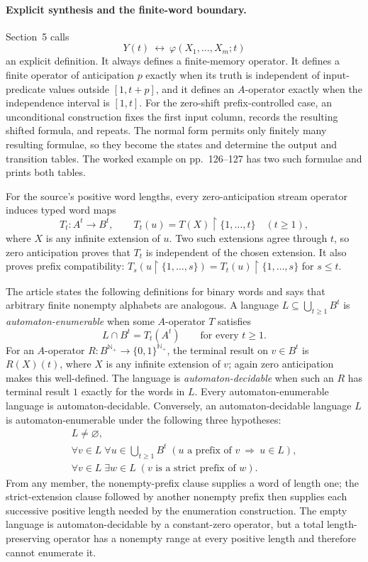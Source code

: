 \paragraph{Explicit synthesis and the finite-word boundary.}
Section~5 calls
\[
  Y(t)\ \longleftrightarrow\ \varphi(X_1,\ldots,X_m;t)
\]
an explicit definition.  It always defines a finite-memory operator.  It
defines a finite operator of anticipation \(p\) exactly when its truth is
independent of input-predicate values outside \([1,t+p]\), and it defines an
\(A\)-operator exactly when the independence interval is \([1,t]\).  For the
zero-shift prefix-controlled case, an unconditional construction fixes the
first input column, records the resulting shifted formula, and repeats.  The
normal form permits only finitely many resulting formulae, so they become the
states and determine the output and transition tables.  The worked example on
pp.~126--127 has two such formulae and prints both tables.

For the source's positive word lengths, every zero-anticipation stream operator
induces typed word maps
\[
  T_t:A^t\longrightarrow B^t,
  \qquad
  T_t(u)=T(X)\mathbin{\upharpoonright}\{1,\ldots,t\}\quad(t\geq1),
\]
where \(X\) is any infinite extension of \(u\).  Two such extensions agree
through \(t\), so zero anticipation proves that \(T_t\) is independent of the
chosen extension.  It also proves prefix compatibility:
\(T_s(u\mathbin{\upharpoonright}\{1,\ldots,s\})
=T_t(u)\mathbin{\upharpoonright}\{1,\ldots,s\}\) for \(s\leq t\).

The article states the following definitions for binary words and says that
arbitrary finite nonempty alphabets are analogous.  A language
\(L\subseteq\bigcup_{t\geq1}B^t\) is \emph{automaton-enumerable} when some
\(A\)-operator \(T\)
satisfies
\[
  L\cap B^t=T_t(A^t)\qquad\text{for every }t\geq1.
\]
For an \(A\)-operator
\(R:B^{\mathbb N_{+}}\to\{0,1\}^{\mathbb N_{+}}\), the terminal result on
\(v\in B^t\) is \(R(X)(t)\), where \(X\) is any infinite extension of \(v\);
again zero anticipation makes this well-defined.  The language is
\emph{automaton-decidable} when such an \(R\) has terminal result \(1\) exactly
for the words in \(L\).  Every automaton-enumerable language is
automaton-decidable.  Conversely, an automaton-decidable language \(L\)
is automaton-enumerable under the following three hypotheses:
\[
 \begin{gathered}
  L\neq\varnothing,\\
  \forall v\in L\;\forall u\in\bigcup_{t\geq1}B^t\;
     (u\text{ a prefix of }v\ \Longrightarrow\ u\in L),\\
  \forall v\in L\;\exists w\in L\;
     (v\text{ is a strict prefix of }w).
 \end{gathered}
\]
From any member, the nonempty-prefix clause supplies a word of length one;
the strict-extension clause followed by another nonempty prefix then supplies
each successive positive length needed by the enumeration construction.
The empty language is automaton-decidable by a constant-zero operator,
but a total length-preserving operator has a nonempty range at every
positive length and therefore cannot enumerate it.


